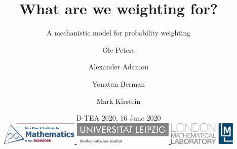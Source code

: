 \title[\insertlogo\\
\vspace{.5em}
\lmlblue{Mark Kirstein}]{\textbf{
What are we weighting for?
}}
\subtitle{A mechanistic model for probability weighting}


\author[M Kirstein]{
Ole Peters \and Alexander Adamou \and Yonatan Berman \and Mark Kirstein\\
\vspace{.5em}
{%
	}
	}

\date[17 June 2020]{
D-TEA 2020, 16 June 2020\\
\vspace{.5cm}
\href{https://www.mis.mpg.de/jjost/research/economics.html}{
\includegraphics[height=1.1cm]{img/MPIMIS_en.png}
}
\hfill
\href{https://www.math.uni-leipzig.de/cms/de/forschung/abteilungen/wima/}{
\includegraphics[height=1.1cm]{img/Uni_Leipzig_MathemInstitut.jpg}
}
\hfill
\href{http://lml.org.uk}{
\includegraphics[height=1.1cm]{img/LML_LOGO_whiteBG.jpg}
}
}
